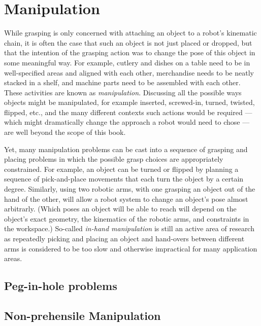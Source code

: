\section{Manipulation}
While grasping is only concerned with attaching an object to a robot's kinematic chain, it is often the case that such an object is not just placed or dropped, but that the intention of the grasping action was to change the pose of this object in some meaningful way. For example, cutlery and dishes on a table need to be in well-specified areas and aligned with each other, merchandise needs to be neatly stacked in a shelf, and machine parts need to be assembled with each other. These activities are known as \emph{manipulation}. Discussing all the possible ways objects might be manipulated, for example inserted, screwed-in, turned, twisted, flipped, etc., and the many different contexts such actions would be required --- which might dramatically change the approach a robot would need to chose --- are well beyond the scope of this book.

Yet, many manipulation problems can be cast into a sequence of grasping and placing problems in which the possible grasp choices are appropriately constrained. For example, an object can be turned or flipped by planning a sequence of pick-and-place movements that each turn the object by a certain degree. Similarly, using two robotic arms, with one grasping an object out of the hand of the other, will allow a robot system to change an object's pose almost arbitrarly. (Which poses an object will be able to reach will depend on the object's exact geometry, the kinematics of the robotic arms, and constraints in the workspace.) So-called \emph{in-hand manipulation} is still an active area of research as  repeatedly picking and placing an object and hand-overs between different arms is considered to be too slow and otherwise impractical for many application areas.  

\subsection{Peg-in-hole problems}
\subsection{Non-prehensile Manipulation}

